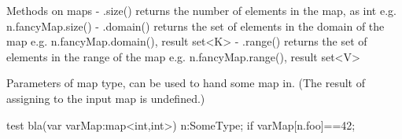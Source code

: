 Methods on maps
- .size() returns the number of elements in the map, as int
 e.g. n.fancyMap.size()
- .domain() returns the set of elements in the domain of the map
 e.g. n.fancyMap.domain(), result set<K>
- .range() returns the set of elements in the range of the map
 e.g. n.fancyMap.range(), result set<V>

Parameters of map type, can be used to hand some map in.
(The result of assigning to the input map is undefined.)
\begin{grgen}
test bla(var varMap:map<int,int>) 
{
	n:SomeType;
	if {  varMap[n.foo]==42; }
}
\end{grgen}